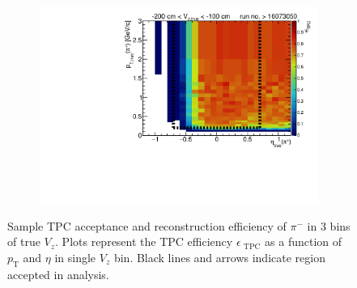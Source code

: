 \begin{figure}[h!]
\begin{subfigure}{.49\textwidth}
		\includegraphics[width=\textwidth,page=18]{chapters/chrgSTAR/img/tpcEffi/Eff2D_TPC_pion_Plus_RunRange2.pdf}
	\end{subfigure}
	\begin{minipage}{.49\textwidth}
		\caption{Sample TPC acceptance and reconstruction efficiency of $\pi^-$ in 3 bins of true $V_z$. Plots represent the TPC efficiency $\epsilon_\textrm{ TPC}$ as a function of $p_\textrm{T}$ and $\eta$ in single $V_z$ bin. Black lines and arrows indicate region accepted in analysis.}
		\label{fig:tpcEffi}
	\end{minipage}
	
\end{figure}


